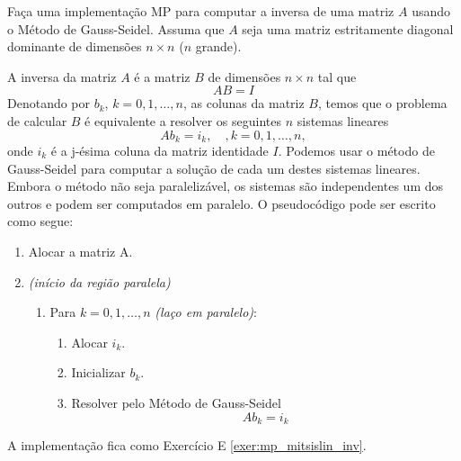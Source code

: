 \begin{exeresol}\label{exeresol:mp_mitsislin_inv}
  Faça uma implementação MP para computar a inversa de uma matriz $A$ usando o Método de Gauss-Seidel. Assuma que $A$ seja uma matriz estritamente diagonal dominante de dimensões $n\times n$ ($n$ grande).
\end{exeresol}
\begin{resol}
  A inversa da matriz $A$ é a matriz $B$ de dimensões $n\times n$ tal que
  \begin{equation}
    AB = I
  \end{equation}
  Denotando por $b_k$, $k=0,1,\dotsc,n$, as colunas da matriz $B$, temos que o problema de calcular $B$ é equivalente a resolver os seguintes $n$ sistemas lineares
  \begin{equation}
    Ab_k = i_k,\quad,k=0,1,\dotsc,n,
  \end{equation}
  onde $i_k$ é a j-ésima coluna da matriz identidade $I$. Podemos usar o método de Gauss-Seidel para computar a solução de cada um destes sistemas lineares. Embora o método não seja paralelizável, os sistemas são independentes um dos outros e podem ser computados em paralelo. O pseudocódigo pode ser escrito como segue:
  \begin{enumerate}
  \item Alocar a matriz A.
  \item {\it (início da região paralela)}
    \begin{enumerate}
    \item Para $k=0,1,\dotsc,n$ {\it (laço em paralelo)}:
      \begin{enumerate}
      \item Alocar $i_k$.
      \item Inicializar $b_k$.
      \item Resolver pelo Método de Gauss-Seidel
        \begin{equation}
          Ab_k = i_k
        \end{equation}
      \end{enumerate}
    \end{enumerate}
  \end{enumerate}
  A implementação fica como Exercício E \ref{exer:mp_mitsislin_inv}.
\end{resol}

